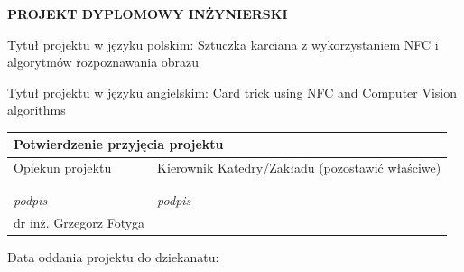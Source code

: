 \vspace*{10mm}
\begin{center}
    \large{
\textbf{PROJEKT DYPLOMOWY INŻYNIERSKI}}
\end{center}
\vspace*{10mm}
\begin{flushleft}
Tytuł projektu w języku polskim: Sztuczka karciana z wykorzystaniem NFC i algorytmów rozpoznawania obrazu

Tytuł projektu w języku angielskim: Card trick using NFC and Computer Vision algorithms
\end{flushleft}
\vspace*{10mm}
\begin{center}
\begin{tabular}{|l|l|} \hline
\multicolumn{2}{|l|}{Potwierdzenie przyjęcia projektu}\\
\hline
Opiekun projektu & Kierownik Katedry/Zakładu (pozostawić właściwe) \\ & \\ & \\
\small{\textit{podpis}} & \small{\textit{podpis}}\\
\hline
dr inż. Grzegorz Fotyga & \\
\hline 
\end{tabular}
\end{center}

\vspace*{5mm}
\begin{flushleft}
Data oddania projektu do dziekanatu:
\end{flushleft}
